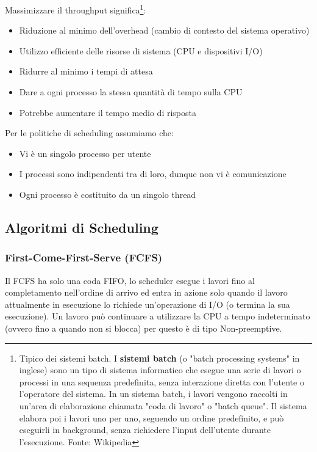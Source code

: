 \documentclass{article}
\begin{document}
\pagebreak

Massimizzare il throughput significa\footnote{Tipico dei sistemi batch. I \textbf{sistemi batch} (o "batch processing systems" in inglese) sono un tipo di sistema informatico che esegue una serie di lavori o processi in una sequenza predefinita, senza interazione diretta con l'utente o l'operatore del sistema.
In un sistema batch, i lavori vengono raccolti in un'area di elaborazione chiamata "coda di lavoro" o "batch queue". Il sistema elabora poi i lavori uno per uno, seguendo un ordine predefinito, e può eseguirli in background, senza richiedere l'input dell'utente durante l'esecuzione. Fonte: Wikipedia}:
\begin{itemize}
    \item Riduzione al minimo dell'overhead (cambio di contesto del sistema operativo)
    \item Utilizzo efficiente delle risorse di sistema (CPU e dispositivi I/O)
    \item Ridurre al minimo i tempi di attesa
    \item Dare a ogni processo la stessa quantità di tempo sulla CPU 
    \item Potrebbe aumentare il tempo medio di risposta
\end{itemize}


Per le politiche di scheduling assumiamo che:
\begin{itemize}
    \item Vi è un singolo processo per utente
    \item I processi sono indipendenti tra di loro, dunque non vi è comunicazione 
    \item Ogni processo è costituito da un singolo thread
\end{itemize}

\subsection{Algoritmi di Scheduling}
\subsubsection{First-Come-First-Serve (FCFS)}
Il FCFS ha solo una coda FIFO, lo scheduler esegue i lavori fino al completamento nell'ordine di arrivo ed entra in azione solo quando il lavoro attualmente in esecuzione lo richiede un'operazione di I/O (o termina la sua esecuzione). Un lavoro può continuare a utilizzare la CPU a tempo indeterminato (ovvero fino a quando non si blocca) per questo è di tipo Non-preemptive. 
\pagebreak
\end{document}
